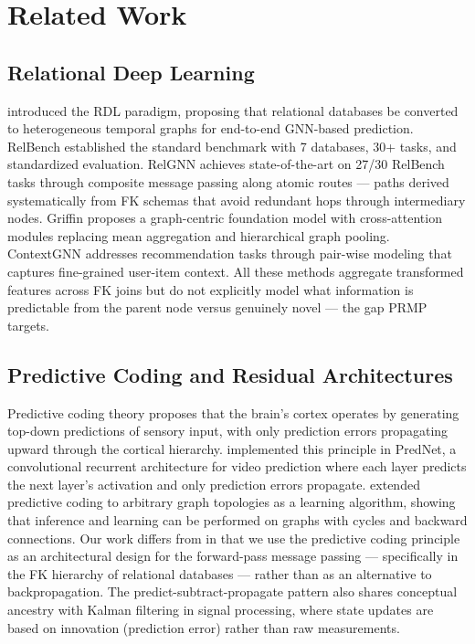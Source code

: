 \documentclass[11pt,letterpaper]{article}
\begin{document}
\section{Related Work}
\label{sec:related}

\subsection{Relational Deep Learning}

\citet{Fey2024} introduced the RDL paradigm, proposing that relational databases be converted to heterogeneous temporal graphs for end-to-end GNN-based prediction. RelBench \citep{Robinson2024} established the standard benchmark with 7 databases, 30+ tasks, and standardized evaluation. RelGNN \citep{Chen2025} achieves state-of-the-art on 27/30 RelBench tasks through composite message passing along atomic routes --- paths derived systematically from FK schemas that avoid redundant hops through intermediary nodes. Griffin \citep{Wang2025} proposes a graph-centric foundation model with cross-attention modules replacing mean aggregation and hierarchical graph pooling. ContextGNN \citep{Yuan2025} addresses recommendation tasks through pair-wise modeling that captures fine-grained user-item context. All these methods aggregate transformed features across FK joins but do not explicitly model what information is predictable from the parent node versus genuinely novel --- the gap PRMP targets.

\subsection{Predictive Coding and Residual Architectures}

Predictive coding theory \citep{Rao1999} proposes that the brain's cortex operates by generating top-down predictions of sensory input, with only prediction errors propagating upward through the cortical hierarchy. \citet{Lotter2017} implemented this principle in PredNet, a convolutional recurrent architecture for video prediction where each layer predicts the next layer's activation and only prediction errors propagate. \citet{Salvatori2022} extended predictive coding to arbitrary graph topologies as a learning algorithm, showing that inference and learning can be performed on graphs with cycles and backward connections. Our work differs from \citet{Salvatori2022} in that we use the predictive coding principle as an architectural design for the forward-pass message passing --- specifically in the FK hierarchy of relational databases --- rather than as an alternative to backpropagation. The predict-subtract-propagate pattern also shares conceptual ancestry with Kalman filtering in signal processing, where state updates are based on innovation (prediction error) rather than raw measurements.
\end{document}
